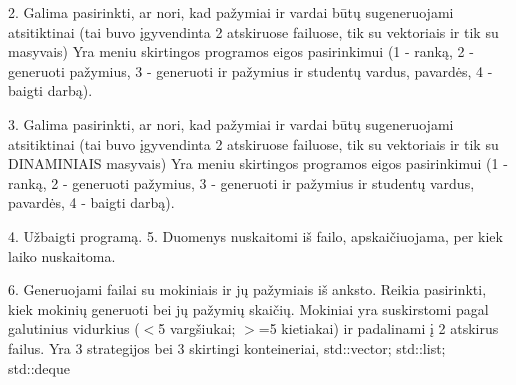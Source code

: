 2. Galima pasirinkti, ar nori, kad pažymiai ir vardai būtų sugeneruojami atsitiktinai (tai buvo įgyvendinta 2 atskiruose failuose, tik su vektoriais ir tik su masyvais) Yra meniu skirtingos programos eigos pasirinkimui (1 -\/ ranką, 2 -\/ generuoti pažymius, 3 -\/ generuoti ir pažymius ir studentų vardus, pavardės, 4 -\/ baigti darbą).

3. Galima pasirinkti, ar nori, kad pažymiai ir vardai būtų sugeneruojami atsitiktinai (tai buvo įgyvendinta 2 atskiruose failuose, tik su vektoriais ir tik su DINAMINIAIS masyvais) Yra meniu skirtingos programos eigos pasirinkimui (1 -\/ ranką, 2 -\/ generuoti pažymius, 3 -\/ generuoti ir pažymius ir studentų vardus, pavardės, 4 -\/ baigti darbą).

4. Užbaigti programą. 5. Duomenys nuskaitomi iš failo, apskaičiuojama, per kiek laiko nuskaitoma.

6. Generuojami failai su mokiniais ir jų pažymiais iš anksto. Reikia pasirinkti, kiek mokinių generuoti bei jų pažymių skaičių. Mokiniai yra suskirstomi pagal galutinius vidurkius (\texorpdfstring{$<$}{<}5 vargšiukai; \texorpdfstring{$>$}{>}=5 kietiakai) ir padalinami į 2 atskirus failus. Yra 3 strategijos bei 3 skirtingi konteineriai, std\+::vector; std\+::list; std\+::deque 